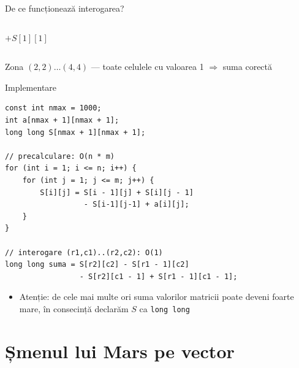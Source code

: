 \documentclass{beamer}
\begin{document}
\begin{frame}{De ce funcționează interogarea?}
\begin{columns}[c]
    \centering
    {\footnotesize $+S[1][1]$}
    \begin{center}
    \end{center}
  \end{columns}

  \vfill
  \begin{center}
    \small Zona $(2,2)\ldots(4,4)$ — toate celulele cu valoarea 1 $\Rightarrow$ suma corectă \checkmark
  \end{center}
\end{frame}

\begin{frame}{Implementare}
  \begin{lstlisting}
const int nmax = 1000;
int a[nmax + 1][nmax + 1];
long long S[nmax + 1][nmax + 1];

// precalculare: O(n * m)
for (int i = 1; i <= n; i++) {
    for (int j = 1; j <= m; j++) {
        S[i][j] = S[i - 1][j] + S[i][j - 1]
                  - S[i-1][j-1] + a[i][j];
    }
}

// interogare (r1,c1)..(r2,c2): O(1)
long long suma = S[r2][c2] - S[r1 - 1][c2]
                 - S[r2][c1 - 1] + S[r1 - 1][c1 - 1];
  \end{lstlisting}

  \begin{itemize}
    \item \alert{Atenție:} de cele mai multe ori suma valorilor matricii poate deveni foarte mare, în consecință declarăm $S$ ca \texttt{long long}
  \end{itemize}
\end{frame}

\section{Șmenul lui Mars pe vector}
\end{document}
